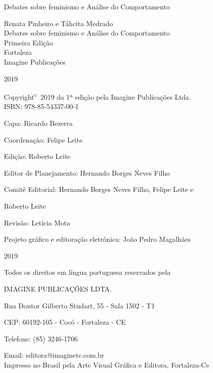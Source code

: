 \documentclass[hidelinks, 4pt]{bookest}
\let\orignewcommand\newcommand  %
\let\newcommand\providecommand  %
\let\newcommand\orignewcommand  %
\newcommand\blankpage{%
    \null
    \thispagestyle{empty}%
    \addtocounter{page}{-1}%
    \newpage}
\begin{document}
%
\begin{titlepage}
    \vspace*{\fill}
    \begin{center}
        {\Huge Debates sobre feminismo e Análise do Comportamento}
    \end{center}
    \vspace*{\fill}
    \pagestyle{empty}
    \afterpage{\null\newpage}
    \blankpage
\begin{center}
    \vfill
\end{center}
\begin{center}
{\Large Renata Pinheiro e Táhcita Medrado }\\[4cm]
{\Huge Debates sobre feminismo e Análise do Comportamento}\\[4cm]

{\Large Primeira Edição}\\[3cm]


{\large Fortaleza\\
Imagine Publicações}

2019
\pagebreak
\thispagestyle{empty}
\end{center}
\pagebreak

Copyright\textsuperscript{\textcircled{c}} 2019 da 1ª edição pela Imagine Publicações Ltda.\\

ISBN: 978-85-54337-00-1

Capa: Ricardo Bezerra

Coordenação: Felipe Leite

Edição: Roberto Leite

Editor de Planejamento: Hernando Borges Neves Filho

Comitê Editorial: Hernando Borges Neves Filho, Felipe Leite e

Roberto Leite

Revisão: Letícia Mota

Projeto gráfico e editoração eletrônica: João Pedro Magalhães\\
\vfill
\begin{center}
\end{center}

2019

Todos os direitos em língua portuguesa reservados pela

IMAGINE PUBLICAÇÕES LDTA.

Rua Doutor Gilberto Studart, 55 - Sala 1502 - T1

CEP: 60192-105 - Cocó - Fortaleza - CE

Telefone: (85) 3246-1706

Email: editora@imaginetc.com.br\\

Impresso no Brasil pela Arte Visual Gráfica e Editora, Fortaleza-Ce
\thispagestyle{empty}
\end{titlepage}
\end{document}
